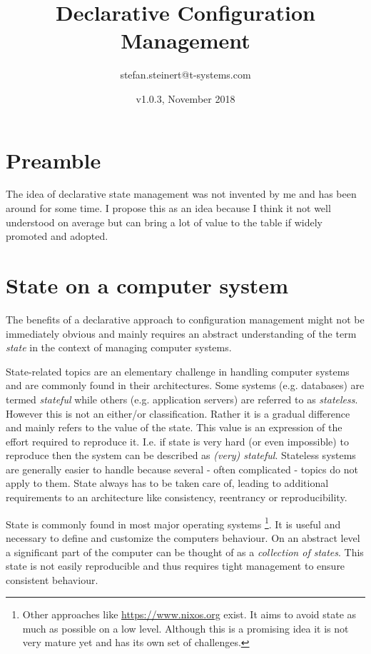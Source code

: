 \documentclass[12pt, a4paper]{article}
\title{Declarative Configuration Management}
\author{stefan.steinert@t-systems.com}
\date{v1.0.3, November 2018}
\begin{document}
\maketitle
\tableofcontents
\clearpage

\section{Preamble}
The idea of declarative state management was not invented by me and has been around for some time. I propose this as an idea because I think it not well understood on average but can bring a lot of value to the table if widely promoted and adopted.

\section{State on a computer system}
The benefits of a declarative approach to configuration management might not be immediately obvious and mainly requires an abstract understanding of the term \textit{state} in the context of managing computer systems.

State-related topics are an elementary challenge in handling computer systems and are commonly found in their architectures. Some systems (e.g. databases) are termed \textit{stateful} while others (e.g. application servers) are referred to as \textit{stateless}. However this is not an either/or classification. Rather it is a gradual difference and mainly refers to the value of the state. This value is an expression of the effort required to reproduce it. I.e. if state is very hard (or even impossible) to reproduce then the system can be described as \textit{(very) stateful}. Stateless systems are generally easier to handle because several - often complicated - topics do not apply to them. State always has to be taken care of, leading to additional requirements to an architecture like consistency, reentrancy or reproducibility.

State is commonly found in most major operating systems \footnote{Other approaches like \url{https://www.nixos.org} exist. It aims to avoid state as much as possible on a low level. Although this is a promising idea it is not very mature yet and has its own set of challenges.}. It is useful and necessary to define and customize the computers behaviour. On an abstract level a significant part of the computer can be thought of as a \textit{collection of states}. This state is not easily reproducible and thus requires tight management to ensure consistent behaviour.
\end{document}
